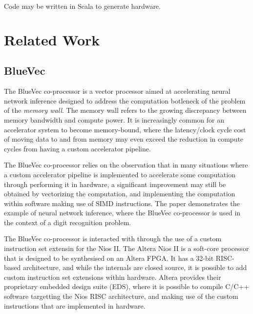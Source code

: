 \documentclass[a4paper,8pt]{report}
\begin{document}
Code may be written in Scala to generate hardware.











\chapter{Related Work} 
\section{BlueVec}
The BlueVec co-processor is a vector processor aimed at accelerating neural
network inference designed to address the computation botleneck of the problem
of the \emph{memory wall}.
The memory wall refers to the growing discrepancy between memory bandwidth and
compute power. It is increasingly common for an accelerator system to become
memory-bound, where the latency/clock cycle cost of moving data to and from
memory may even exceed the reduction in compute cycles from having a custom
accelerator pipeline.

The BlueVec co-processor relies on the observation that in many situations where
a custom accelerator pipeline is implemented to accelerate some computation
through performing it in hardware, a significant improvement may still be obtained
by vectorizing the computation, and implementing the computation within
software making use of SIMD instructions. The paper demonstrates the example of
neural network inference, where the BlueVec co-processor is used in the context
of a digit recognition problem.

The BlueVec co-processor is interacted with through the use of a custom
instruction set extensin for the Nios II. The Altera Nios II is a soft-core processor
that is designed to be synthesised on an Altera FPGA. It has a 32-bit RISC-based
architecture, and while the internals are closed source, it is possible to add
custom instruction set extensions within hardware. Altera provides their
proprietary embedded design suite (EDS), where it is possible to compile C/C++
software targetting the Nios RISC architecture, and making use of the custom
instructions that are implemented in hardware.
\end{document}
